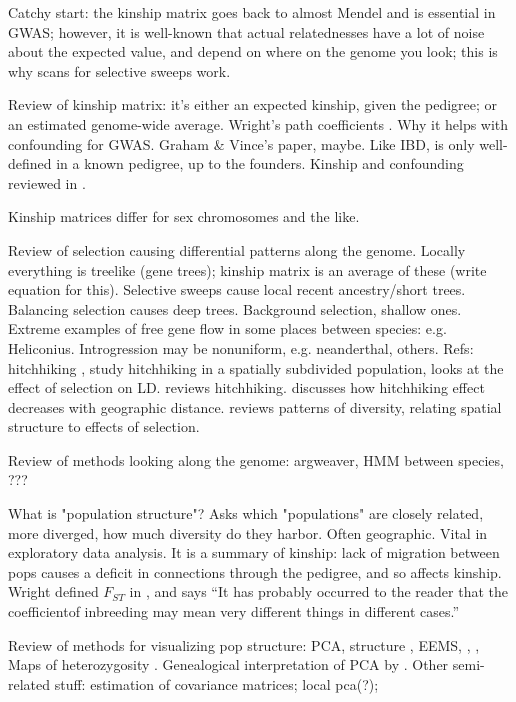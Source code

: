 \documentclass[11pt, oneside]{article}   	%
\begin{document}
Catchy start: the kinship matrix goes back to almost Mendel and is essential in GWAS;
however, it is well-known that actual relatednesses have a lot of noise about the expected value,
and depend on where on the genome you look;
this is why scans for selective sweeps work.

Review of kinship matrix: 
it's either an expected kinship, given the pedigree;
or an estimated genome-wide average.
Wright's path coefficients \citep{wright1943isolation}.
Why it helps with confounding for GWAS.
Graham \& Vince's paper, maybe.
Like IBD, is only well-defined in a known pedigree, up to the founders.
Kinship and confounding reviewed in \citet{astle2009population}.

Kinship matrices differ for sex chromosomes and the like.

Review of selection causing differential patterns along the genome.
Locally everything is treelike (gene trees);
kinship matrix is an average of these (write equation for this).
Selective sweeps cause local recent ancestry/short trees.
Balancing selection causes deep trees.
Background selection, shallow ones.
Extreme examples of free gene flow in some places between species: e.g. Heliconius.
Introgression may be nonuniform, e.g. neanderthal, others.
Refs: hitchhiking \citep{maynardsmith1974hitchhiking},
\citet{kim2011hitchhiking} study hitchhiking in a spatially subdivided population,
\citet{mcvean2007structure} looks at the effect of selection on LD.
\citet{barton2000genetic} reviews hitchhiking.
\citet{bierne2010distinctive} discusses how hitchhiking effect decreases with geographic distance.
\citet{charlesworth2003review} reviews patterns of diversity, relating spatial structure to effects of selection.

Review of methods looking along the genome:
argweaver, HMM between species, ???

What is "population structure"?
Asks which "populations" are closely related, more diverged, how much diversity do they harbor.
Often geographic.
Vital in exploratory data analysis.
It is a summary of kinship: 
lack of migration between pops causes a deficit in connections through the pedigree,
and so affects kinship.
Wright defined $F_{ST}$ in \citep{wright1949genetical}, and says ``It has probably occurred to the reader that the coefficientof inbreeding may mean very different
things in different cases.''

Review of methods for visualizing pop structure:
PCA, structure \citep{falush2003inference}, EEMS, \citep{petkova2014visualizing}, \citep{yang2012modelbased},
Maps of heterozygosity \citep{ramachandran2005support}.
Genealogical interpretation of PCA by \citet{mcvean2009genealogical}.
Other semi-related stuff:
estimation of covariance matrices;
local pca(?);
\end{document}

